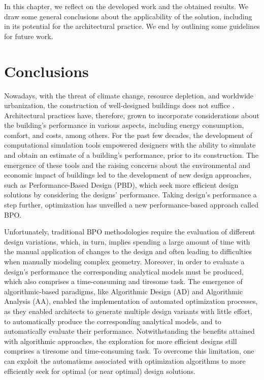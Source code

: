 \label{chap:conclusion}

In this chapter, we reflect on the developed work and the obtained results. We draw some general conclusions about the applicability of the solution, including in its potential for the architectural practice. We end by outlining some guidelines for future work. 

\section{Conclusions}
Nowadays, with the threat of climate change, resource depletion, and worldwide urbanization, the construction of well-designed buildings does not suffice \cite{Wortmann2015AdvSBO}. Architectural practices have, therefore, grown to incorporate considerations about the building's performance in various aspects, including energy consumption, comfort, and costs, among others. For the past few decades, the development of computational simulation tools empowered designers with the ability to simulate and obtain an estimate of a building’s performance, prior to its construction. The emergence of these tools and the raising concerns about the environmental and economic impact of buildings led to the development of new design approaches, such as Performance-Based Design (\ac{PBD}), which seek more efficient design solutions by considering the designs’ performance. Taking design’s performance a step further, optimization has unveilled a new performance-based approach called \ac{BPO}. 

Unfortunately, traditional \ac{BPO} methodologies require the evaluation of different design variations, which, in turn, implies spending a large amount of time with the manual application of changes to the design and often leading to difficulties when manually modeling complex geometry. Moreover, in order to evaluate a design's performance the corresponding analytical models must be produced, which also comprises a time-consuming and tiresome task. The emergence of algorithmic-based paradigms, like Algorithmic Design (\ac{AD}) and Algorithmic Analysis (\ac{AA}), enabled the implementation of automated optimization processes, as they enabled architects to generate multiple design variants with little effort, to automatically produce the corresponding analytical models, and to automatically evaluate their performance. Notwithstanding the benefits attained with algorithmic approaches, the exploration for more efficient designs still comprises a tiresome and time-consuming task. To overcome this limitation, one can exploit the automatisms associated with optimization algorithms to more efficiently seek for optimal (or near optimal) design solutions.

